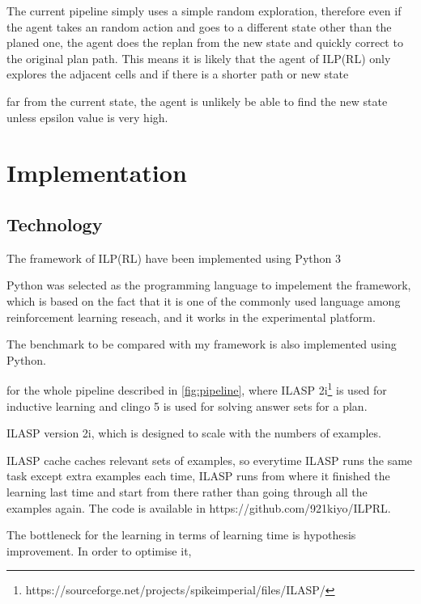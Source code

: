 The current pipeline simply uses a simple random exploration, therefore even if the agent takes an random action and goes to a different state other than the planed one, 
the agent does the replan from the new state and quickly correct to the original plan path. This means it is likely that the agent of ILP(RL) only explores the adjacent cells and if there is a shorter path or new state

far from the current state, the agent is unlikely be able to find the new state unless epsilon value is very high. 


\section{Implementation}
\label{Implementation}


\subsection{Technology}
The framework of ILP(RL) have been implemented using Python 3

Python was selected as the programming language to impelement the framework, which is based on the fact that it is one of the commonly used language among reinforcement learning reseach, 
and it works in the experimental platform. 

The benchmark to be compared with my framework is also implemented using Python.

for the whole pipeline described in \ref{fig:pipeline}, where ILASP 2i\footnote{https://sourceforge.net/projects/spikeimperial/files/ILASP/} is used for inductive learning and clingo 5 is used for solving answer sets for a plan.

ILASP version 2i, which is designed to scale with the numbers of examples.

ILASP cache caches relevant sets of examples, so everytime ILASP runs the same task except extra examples each time, ILASP runs from where it finished the learning last time and start from there rather than going through all the examples again.
The code is available in https://github.com/921kiyo/ILPRL.

The bottleneck for the learning in terms of learning time is hypothesis improvement. In order to optimise it,

